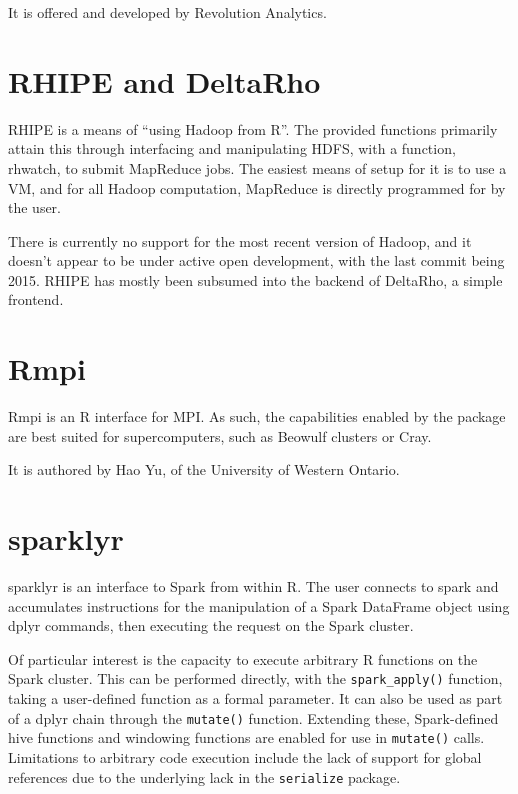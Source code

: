 \documentclass[10pt,a4paper]{article}
\begin{document}
It is offered and developed by Revolution Analytics.

\section{RHIPE and DeltaRho}
\label{sec:rhipe-deltarho}

RHIPE is a means of ``using Hadoop from R''\cite{deltarho:_rhipe}. The
provided functions primarily attain this through interfacing and
manipulating HDFS, with a function, rhwatch, to submit MapReduce jobs.
The easiest means of setup for it is to use a VM, and for all Hadoop
computation, MapReduce is directly programmed for by the user.

There is currently no support for the most recent version of Hadoop,
and it doesn't appear to be under active open development, with the
last commit being 2015. RHIPE has mostly been subsumed into the
backend of DeltaRho, a simple frontend.

\section{Rmpi}
\label{sec:rmpi}

Rmpi is an R interface for MPI\cite{yu02:_rmpi}. As such, the
capabilities enabled by the package are best suited for
supercomputers, such as Beowulf clusters or Cray.

It is authored by Hao Yu, of the University of Western Ontario.

\section{sparklyr}
\label{sec:sparklyr}

sparklyr is an interface to Spark from within R\cite{luraschi20}. The user
connects to spark and accumulates instructions for the manipulation of a Spark
DataFrame object using dplyr commands, then executing the request on the Spark
cluster.

Of particular interest is the capacity to execute arbitrary R functions on the
Spark cluster. This can be performed directly, with the \texttt{spark\_apply()}
function, taking a user-defined function as a formal parameter. It can also be
used as part of a dplyr chain through the \texttt{mutate()} function. Extending
these, Spark-defined hive functions and windowing functions are enabled for use
in \texttt{mutate()} calls. Limitations to arbitrary code execution include the
lack of support for global references due to the underlying lack in the
\texttt{serialize} package.
\end{document}
